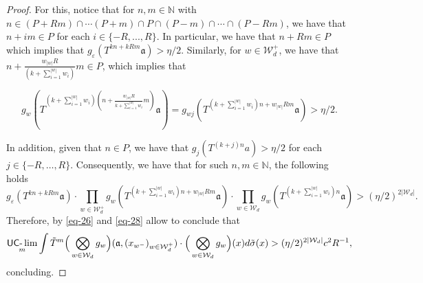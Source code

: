 \documentclass[letter,11pt]{article}
\theoremstyle{definition}
\newcommand{\N}{\mathbb{N}}
\newcommand{\uclim}{\mathop{\textup{\textsf{UC-}}\lim}}
\begin{document}
\begin{proof}
For this, notice that for $n,m\in \N$ with $n\in (P+Rm)\cap\cdots (P+m)\cap P\cap  (P-m)\cap \cdots\cap (P-Rm)$, we have that $n+im\in P$ for each $i\in \{-R,...,R\}$. In particular, we have that $n+Rm\in P$ which implies that $g_\varepsilon(T^{kn+kRm}\mathfrak{a})>\eta/2$. Similarly, for $w\in\mathcal{W}_{d}^{+}$, we have that $n+\frac{w_{|w|}R}{(k+\sum_{i=1}^{|w|}w_i)}m\in P$, which implies that 

$$g_{w}(T^{(k+\sum_{i=1}^{|w|}w_i)(n+\frac{w_{|w|}R}{k+\sum_{i=1}^{|w|}w_i}m) }\mathfrak{a})= g_{wj}(T^{(k+\sum_{i=1}^{|w|}w_i)n+w_{|w|}Rm}\mathfrak{a})>\eta/2.$$

In addition, given that $n\in P$, we have that $g_j(T^{(k+j)n}a)>\eta/2$ for each $j\in \{-R,\ldots,R\}$. Consequently, we have that for such $n,m\in \N$, the following holds
\begin{equation}\label{eq-28}
       g_\varepsilon(T^{kn+kRm}\mathfrak{a})\cdot\prod_{w\in \mathcal{W}_d^{+}} g_{w}(T^{(k+\sum_{i=1}^{|w|}w_i)n+w_{|w|}Rm}\mathfrak{a})\cdot \prod_{w\in \mathcal{W}_d}g_w(T^{(k+\sum_{i=1}^{|w|}w_i)n}\mathfrak{a})>(\eta/2)^{2|\mathcal{W}_d|}.
\end{equation}
Therefore, by \cref{eq-26} and \cref{eq-28} allow to conclude that 
\begin{equation*}
     \uclim_{m}\int    \tilde{T}^m \Big(  \bigotimes_{w\in \mathcal{W}_d} g_{w}\Big)(\mathfrak{a}, (x_{w^-})_{w\in \mathcal{W}_{d}^{+}} )\cdot \Big(\bigotimes_{w\in \mathcal{W}_d}g_{w}  \Big)(x)   d\tilde{\sigma}(x) >(\eta/2)^{2|\mathcal{W}_d|}c^2R^{-1},
\end{equation*}
concluding. 
\end{proof}
\end{document}
